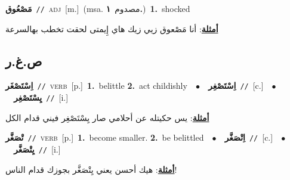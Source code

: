 \documentclass[10pt,a4paper,twoside]{article} %
\begin{document}
\begin{multicols}{2}
{\setlength\topsep{0pt}\textbf{\foreignlanguage{arabic}{مَصْعُوق}}\ {\color{gray}\texttt{//}\color{black}}\ \textsc{adj}\ [m.]\ \color{gray}(msa. \foreignlanguage{arabic}{مصدوم}~\foreignlanguage{arabic}{\textbf{١.}})\color{black}\ \textbf{1.}~shocked\  \begin{flushright}\color{gray}\foreignlanguage{arabic}{\textbf{\underline{\foreignlanguage{arabic}{أمثلة}}}: أنا مَصْعوق زيي زيك هاي إِيمتى لحقت تخطب بهالسرعة}\end{flushright}\color{black}} \vspace{2mm}

\vspace{-3mm}
\subsection*{\color{blue}\foreignlanguage{arabic}{ص.غ.ر}\color{blue}{}} 

{\setlength\topsep{0pt}\textbf{\foreignlanguage{arabic}{اِسْتَصْغَر}}\ {\color{gray}\texttt{//}\color{black}}\ \textsc{verb}\ [p.]\ \textbf{1.}~belittle  \textbf{2.}~act childishly\ \ $\bullet$\ \ \setlength\topsep{0pt}\textbf{\foreignlanguage{arabic}{اِسْتَصْغِر}}\ {\color{gray}\texttt{//}\color{black}}\ [c.]\ \ $\bullet$\ \ \setlength\topsep{0pt}\textbf{\foreignlanguage{arabic}{يِسْتَصْغِر}}\ {\color{gray}\texttt{//}\color{black}}\ [i.]\  \begin{flushright}\color{gray}\foreignlanguage{arabic}{\textbf{\underline{\foreignlanguage{arabic}{أمثلة}}}: يس حكيتله عن أحلامي صار يِسْتَصْغِر فيني قدام الكل}\end{flushright}\color{black}} \vspace{2mm}

{\setlength\topsep{0pt}\textbf{\foreignlanguage{arabic}{تْصَغَّر}}\ {\color{gray}\texttt{//}\color{black}}\ \textsc{verb}\ [p.]\ \textbf{1.}~become smaller.  \textbf{2.}~be belittled\ \ $\bullet$\ \ \setlength\topsep{0pt}\textbf{\foreignlanguage{arabic}{اِتْصَغَّر}}\ {\color{gray}\texttt{//}\color{black}}\ [c.]\ \ $\bullet$\ \ \setlength\topsep{0pt}\textbf{\foreignlanguage{arabic}{يِتْصَغَّر}}\ {\color{gray}\texttt{//}\color{black}}\ [i.]\  \begin{flushright}\color{gray}\foreignlanguage{arabic}{\textbf{\underline{\foreignlanguage{arabic}{أمثلة}}}: هيك أحسن يعني يِتْصَغَّر بجوزك قدام الناس!}\end{flushright}\color{black}} \vspace{2mm}


\end{multicols}
\end{document}
